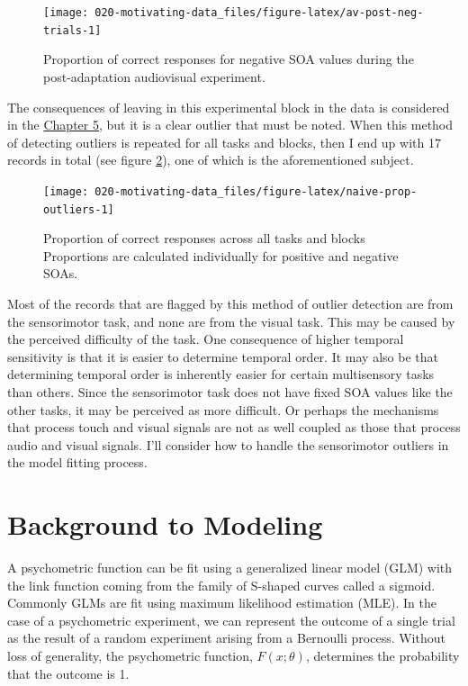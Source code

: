 \documentclass[11pt, oneside]{book}
\begin{document}
\begin{figure}

{\centering \texttt{[image: 020-motivating-data\_files/figure-latex/av-post-neg-trials-1]} 

}

\caption{Proportion of correct responses for negative SOA values during the post-adaptation audiovisual experiment.}\label{fig:av-post-neg-trials}
\end{figure}

The consequences of leaving in this experimental block in the data is considered in the \protect\hyperlink{workflow}{Chapter 5}, but it is a clear outlier that must be noted. When this method of detecting outliers is repeated for all tasks and blocks, then I end up with 17 records in total (see figure \ref{fig:naive-prop-outliers}), one of which is the aforementioned subject.

\begin{figure}

{\centering \texttt{[image: 020-motivating-data\_files/figure-latex/naive-prop-outliers-1]} 

}

\caption{Proportion of correct responses across all tasks and blocks Proportions are calculated individually for positive and negative SOAs.}\label{fig:naive-prop-outliers}
\end{figure}

Most of the records that are flagged by this method of outlier detection are from the sensorimotor task, and none are from the visual task. This may be caused by the perceived difficulty of the task. One consequence of higher temporal sensitivity is that it is easier to determine temporal order. It may also be that determining temporal order is inherently easier for certain multisensory tasks than others. Since the sensorimotor task does not have fixed SOA values like the other tasks, it may be perceived as more difficult. Or perhaps the mechanisms that process touch and visual signals are not as well coupled as those that process audio and visual signals. I'll consider how to handle the sensorimotor outliers in the model fitting process.

\hypertarget{background}{%
\chapter{Background to Modeling}\label{background}}

A psychometric function can be fit using a generalized linear model (GLM) with the link function coming from the family of S-shaped curves called a sigmoid. Commonly GLMs are fit using maximum likelihood estimation (MLE). In the case of a psychometric experiment, we can represent the outcome of a single trial as the result of a random experiment arising from a Bernoulli process. Without loss of generality, the psychometric function, \(F(x; \theta)\), determines the probability that the outcome is 1.
\end{document}
